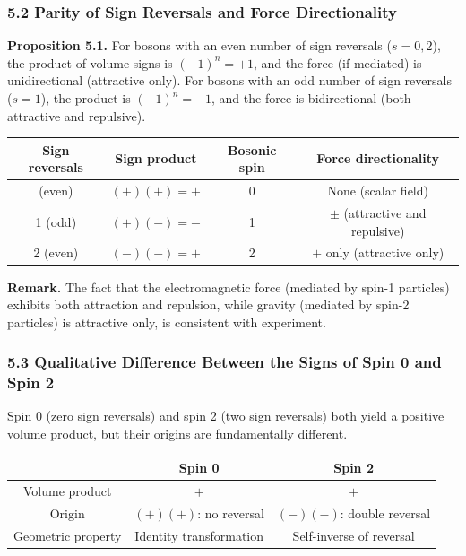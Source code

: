 \documentclass[a4paper,11pt]{article}
\newcounter{none}
\begin{document}
\subsubsection*{5.2 Parity of Sign Reversals and Force Directionality}

\textbf{Proposition 5.1.} For bosons with an even number of sign reversals ($s = 0, 2$), the product of volume signs is $(-1)^n = +1$, and the force (if mediated) is unidirectional (attractive only). For bosons with an odd number of sign reversals ($s = 1$), the product is $(-1)^n = -1$, and the force is bidirectional (both attractive and repulsive).

{\def\LTcaptype{none}
\begin{longtable}[]{@{}cccc@{}}
\toprule
Sign reversals & Sign product & Bosonic spin & Force directionality \\
\midrule
\endhead
\bottomrule
\endlastfoot
0 (even) & $(+)(+) = +$ & 0 & None (scalar field) \\
1 (odd) & $(+)(-) = -$ & 1 & $\pm$ (attractive and repulsive) \\
2 (even) & $(-)(-) = +$ & 2 & $+$ only (attractive only) \\
\end{longtable}
}

\textbf{Remark.} The fact that the electromagnetic force (mediated by spin-1 particles) exhibits both attraction and repulsion, while gravity (mediated by spin-2 particles) is attractive only, is consistent with experiment.

\subsubsection*{5.3 Qualitative Difference Between the Signs of Spin 0 and Spin 2}

Spin 0 (zero sign reversals) and spin 2 (two sign reversals) both yield a positive volume product, but their origins are fundamentally different.

{\def\LTcaptype{none}
\begin{longtable}[]{@{}ccc@{}}
\toprule
& Spin 0 & Spin 2 \\
\midrule
\endhead
\bottomrule
\endlastfoot
Volume product & $+$ & $+$ \\
Origin & $(+)(+)$: no reversal & $(-)(-) $: double reversal \\
Geometric property & Identity transformation & Self-inverse of reversal \\
\end{longtable}
}
\end{document}
